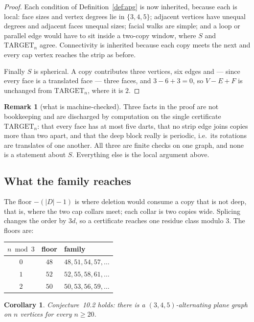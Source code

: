 \documentclass[11pt,a4paper]{amsart}
\theoremstyle{plain}
\newtheorem{corollary}[theorem]{Corollary}
\theoremstyle{definition}
\newtheorem{remark}[theorem]{Remark}
\begin{document}
\begin{proof}
Each condition of Definition~\ref{def:apg} is now inherited, because each is
local: face sizes and vertex degrees lie in $\{3,4,5\}$; adjacent vertices have
unequal degrees and adjacent faces unequal sizes; facial walks are simple; and a
loop or parallel edge would have to sit inside a two-copy window, where $S$ and
$\mathrm{TARGET}_n$ agree. Connectivity is inherited because each copy meets the
next and every cap vertex reaches the strip as before.

Finally $S$ is spherical. A copy contributes three vertices, six edges and ---
since every face is a translated face --- three faces, and $3-6+3=0$, so
$V-E+F$ is unchanged from $\mathrm{TARGET}_n$, where it is $2$.
\end{proof}

\begin{remark}[what is machine-checked]\label{rem:hypotheses}
Three facts in the proof are not bookkeeping and are discharged by computation
on the single certificate $\mathrm{TARGET}_n$: that every face has at most five
darts, that no strip edge joins copies more than two apart, and that the deep
block really is periodic, i.e.\ its rotations are translates of one another. All
three are finite checks on one graph, and none is a statement about $S$.
Everything else is the local argument above.
\end{remark}

\subsection{What the family reaches}

The floor $-(|D|-1)$ is where deletion would consume a copy that is not deep,
that is, where the two cap collars meet; each collar is two copies wide.
Splicing changes the order by $3d$, so a certificate reaches one residue class
modulo $3$. The floors are:

\begin{center}
\begin{tabular}{ccl}
\toprule
$n \bmod 3$ & floor & family \\
\midrule
$0$ & $48$ & $48, 51, 54, 57, \dots$ \\
$1$ & $52$ & $52, 55, 58, 61, \dots$ \\
$2$ & $50$ & $50, 53, 56, 59, \dots$ \\
\bottomrule
\end{tabular}
\end{center}

\begin{corollary}\label{cor:102}
Conjecture~10.2 holds: there is a $(3,4,5)$-alternating plane graph on $n$
vertices for every $n \ge 20$.
\end{corollary}
\end{document}
